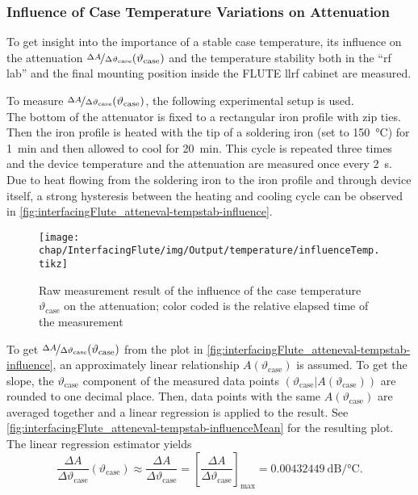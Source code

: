\subsubsection{Influence of Case Temperature Variations on Attenuation}
To get insight into the importance of a stable case temperature, its influence on the attenuation $\nicefrac{\Delta A}{\Delta \vartheta_\text{case}} (\vartheta_\text{case})$ and the temperature stability both in the ``\gls{rf} lab'' and the final mounting position inside the FLUTE \gls{llrf} cabinet are measured.

To measure $\nicefrac{\Delta A}{\Delta \vartheta_\text{case}} (\vartheta_\text{case})$, the following experimental setup is used.\\
The bottom of the attenuator is fixed to a rectangular iron profile with zip ties. Then the iron profile is heated with the tip of a soldering iron (set to \SI{150}{\degreeCelsius}) for \SI{1}{\minute} and then allowed to cool for \SI{20}{\minute}. This cycle is repeated three times and the device temperature and the attenuation are measured once every \SI{2}{\second}. Due to heat flowing from the soldering iron to the iron profile and through device itself, a strong hysteresis between the heating and cooling cycle can be observed in \autoref{fig:interfacingFlute_atteneval-tempstab-influence}.

\begin{figure}[tb]
	\centering
	\texttt{[image: chap/InterfacingFlute/img/Output/temperature/influenceTemp.tikz]}
	\caption[Influence of the case temperature on attenuation]{Raw measurement result of the influence of the case temperature $\vartheta_\text{case}$ on the attenuation; color coded is the relative elapsed time of the measurement}
	\label{fig:interfacingFlute_atteneval-tempstab-influence}
\end{figure}

To get $\nicefrac{\Delta A}{\Delta \vartheta_\text{case}} (\vartheta_\text{case})$ from the plot in \autoref{fig:interfacingFlute_atteneval-tempstab-influence}, an approximately linear relationship $A(\vartheta_\text{case})$ is assumed. To get the slope, the $\vartheta_\text{case}$ component of the measured data points $(\vartheta_\text{case}|A(\vartheta_\text{case}))$ are rounded to one decimal place. Then, data points with the same $A(\vartheta_\text{case})$ are averaged together and a linear regression is applied to the result. See \autoref{fig:interfacingFlute_atteneval-tempstab-influenceMean} for the resulting plot. The linear regression estimator yields
\begin{equation}
\frac{\Delta A}{\Delta \vartheta_\text{case}} (\vartheta_\text{case})
\approx \frac{\Delta A}{\Delta \vartheta_\text{case}}
= \left[\frac{\Delta A}{\Delta \vartheta_\text{case}}\right]_\text{max}
= \SI{0.00432449}{\dB\per\celsius}.
\end{equation}

